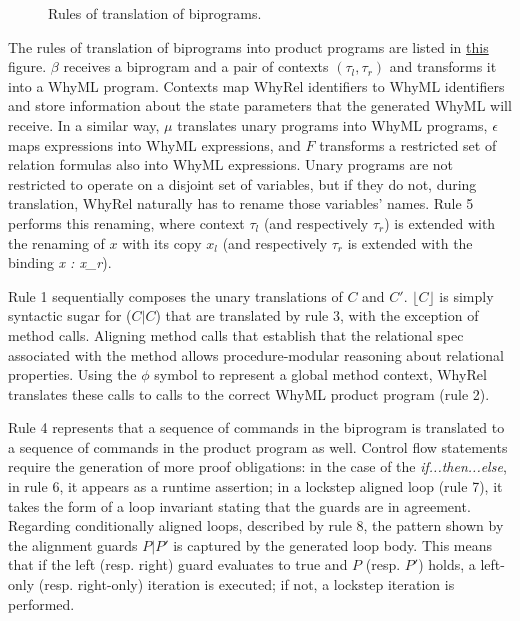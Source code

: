 \begin{figure}[ht]
\begin{minipage}{\linewidth}
  \end{minipage}
  \caption{Rules of translation of biprograms.}
  \label{fig:translation-biprograms-rules}
\end{figure}

The rules of translation of biprograms into product programs are listed in \hyperref[fig:translation-biprograms-rules]{this} figure.
$\beta$ receives a biprogram and a pair of contexts $(\tau_l,\tau_r)$ and transforms it into a WhyML program.
Contexts map WhyRel identifiers to WhyML identifiers and store information about the state parameters that the generated WhyML will receive.
In a similar way, $\mu$ translates unary programs into WhyML programs, $\epsilon$ maps expressions into WhyML expressions, and $F$ transforms a restricted set of relation formulas also into WhyML expressions.
Unary programs are not restricted to operate on a disjoint set of variables, but if they do not, during translation, WhyRel naturally has to rename those variables' names. 
Rule 5 performs this renaming, where context $\tau_l$ (and respectively $\tau_r$) is extended with the renaming of $x$ with its copy $x_l$ (and respectively $\tau_r$ is extended with the binding \emph{x : x\_r}).

Rule 1 sequentially composes the unary translations of $C$ and $C'$.
$\lfloor C \rfloor$ is simply syntactic sugar for ($C|C$) that are translated by rule 3, with the exception of method calls.
Aligning method calls that establish that the relational spec associated with the method allows procedure-modular reasoning about relational properties.
Using the $\phi$ symbol to represent a global method context, WhyRel translates these calls to calls to the correct WhyML product program (rule 2).

Rule 4 represents that a sequence of commands in the biprogram is translated to a sequence of commands in the product program as well.
Control flow statements require the generation of more proof obligations: in the case of the \emph{if...then...else}, in rule 6, it appears as a runtime assertion; in a lockstep aligned loop (rule 7), it takes the form of a loop invariant stating that the guards are in agreement.
Regarding conditionally aligned loops, described by rule 8, the pattern shown by the alignment guards $P | P'$ is captured by the generated loop body.
This means that if the left (resp. right) guard evaluates to true and $P$ (resp. $P'$) holds, a left-only (resp. right-only) iteration is executed; if not, a lockstep iteration is performed.

